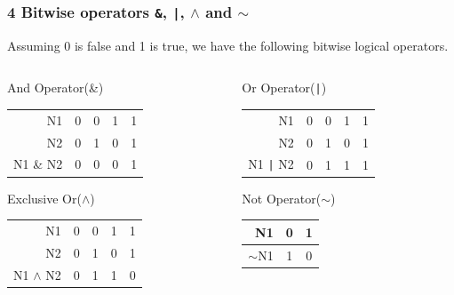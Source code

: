 \documentclass[table]{beamer}
\begin{document}
\begin{frame}
\frametitle{4 Bitwise operators {\tt \&}, {\tt|}, {\tt$\wedge$} and {\tt$\sim$}}
Assuming 0 is false and 1 is true, we have the following bitwise logical operators.
\begin{columns}
\begin{column}{5cm}
\begin{block}{And Operator(\&)}
\begin{tabular}{r|c c c c}
N1&0&0&1&1\\
N2&0&1&0&1\\
\hline
N1 \& N2&0&0&0&1
\end{tabular}
\end{block}

\begin{block}{Exclusive Or({\tt$\wedge$})}
\begin{tabular}{r|c c c c}
N1&0&0&1&1\\
N2&0&1&0&1\\
\hline
N1 {\tt$\wedge$} N2&0&1&1&0
\end{tabular}
\end{block}

\end{column}
\begin{column}{5cm}
\begin{block}{Or Operator({\tt|})}
\begin{tabular}{r|c c c c}
N1&0&0&1&1\\
N2&0&1&0&1\\
\hline
N1 {\tt|} N2&0&1&1&1
\end{tabular}
\end{block}

\begin{block}{Not Operator({\tt$\sim$})}
\begin{tabular}{r|c c}
N1&0&1\\
\hline
{\tt$\sim$}N1&1&0
\end{tabular}
\end{block}
\vspace{0.13in}
\end{column}
\end{columns}
\end{frame}
\end{document}

